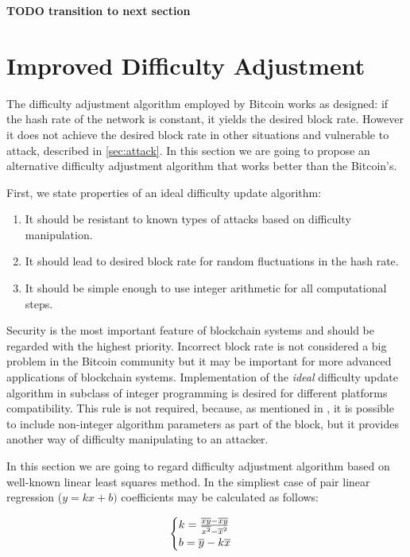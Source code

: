 \documentclass[]{llncs}
\begin{document}
\textbf{TODO transition to next section}



\section{Improved Difficulty Adjustment}
\label{sec:improved}

The difficulty adjustment algorithm employed by Bitcoin works as designed: if the hash rate of the network is constant, it yields the desired block rate. However it does not achieve the desired block rate in other situations and vulnerable to attack, described in \ref{sec:attack}.
In this section we are going to propose an alternative difficulty adjustment algorithm that works better than the Bitcoin's.

First, we state properties of an ideal difficulty update algorithm:
\begin{enumerate}
\item{It should be resistant to known types of attacks based on difficulty manipulation.}
\item{It should lead to desired block rate for random fluctuations in the hash rate.}
\item{It should be simple enough to use integer arithmetic for all computational steps.}
\end{enumerate}

Security is the most important feature of blockchain systems and should be regarded with the highest priority.
Incorrect block rate is not considered a big problem in the Bitcoin community but it may be important for more advanced applications of blockchain systems.
Implementation of the \textit{ideal} difficulty update algorithm in subclass of integer programming is desired for different platforms compatibility.
This rule is not required, because, as mentioned in \cite{kraft2015difficulty}, it is possible to include non-integer algorithm parameters as part of the block, but it provides another way of difficulty manipulating to an attacker.

In this section we are going to regard difficulty adjustment algorithm based on well-known linear least squares method\cite{lawson1974solving}. In the simpliest case of pair linear regression (\(y=kx+b)\) coefficients may be calculated as follows:

\begin{equation}
  \begin{cases}
    k= {{\overline{xy} - \overline{x}\overline{y}} \over {\overline{x^2} - \overline{x}^2}}  \\
    b= \overline{y}-k\overline{x}
  \end{cases}
\end{equation}
\end{document}
